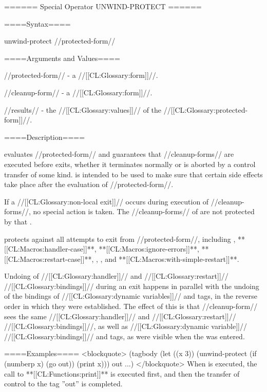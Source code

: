 ====== Special Operator UNWIND-PROTECT ======

====Syntax====

\DefspecWithValues unwind-protect {//protected-form// } {}

====Arguments and Values====

//protected-form// - a //[[CL:Glossary:form]]//.

//cleanup-form// - a //[[CL:Glossary:form]]//.

//results// - the //[[CL:Glossary:values]]// of the //[[CL:Glossary:protected-form]]//.

====Description====

 evaluates //protected-form// and guarantees that //cleanup-forms// are executed before  exits, whether it terminates normally or is aborted by a control transfer of some kind.  is intended to be used to make sure that certain side effects take place after the evaluation of //protected-form//.

If a //[[CL:Glossary:non-local exit]]// occurs during execution of //cleanup-forms//, no special action is taken. The //cleanup-forms// of  are not protected by that .

 protects against all attempts to exit from //protected-form//, including , **[[CL:Macros:handler-case]]**, **[[CL:Macros:ignore-errors]]**, **[[CL:Macros:restart-case]]**, , , and **[[CL:Macros:with-simple-restart]]**.

Undoing of //[[CL:Glossary:handler]]// and //[[CL:Glossary:restart]]// //[[CL:Glossary:bindings]]// during an exit happens in parallel with the undoing of the bindings of //[[CL:Glossary:dynamic variables]]// and  tags, in the reverse order in which they were established. The effect of this is that //cleanup-form// sees the same //[[CL:Glossary:handler]]// and //[[CL:Glossary:restart]]// //[[CL:Glossary:bindings]]//, as well as //[[CL:Glossary:dynamic variable]]// //[[CL:Glossary:bindings]]// and  tags, as were visible when the  was entered.

====Examples==== <blockquote> (tagbody (let ((x 3)) (unwind-protect (if (numberp x) (go out)) (print x))) out ...) </blockquote> When  is executed, the call to **[[CL:Functions:print]]** is executed first, and then the transfer of control to the tag ''out'' is completed.

